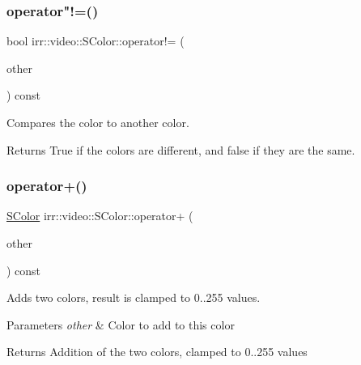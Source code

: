 \subsubsection{\texorpdfstring{operator"!=()}{operator!=()}}
{\footnotesize\ttfamily bool irr\+::video\+::\+S\+Color\+::operator!= (\begin{DoxyParamCaption}\item[{const \hyperlink{classirr_1_1video_1_1SColor}{S\+Color} \&}]{other }\end{DoxyParamCaption}) const\hspace{0.3cm}{\ttfamily [inline]}}



Compares the color to another color. 

\begin{DoxyReturn}{Returns}
True if the colors are different, and false if they are the same. 
\end{DoxyReturn}
\mbox{\label{classirr_1_1video_1_1SColor_a3de50f1cde7bf3f5b1af79c64cd0cdbd}} 
\subsubsection{\texorpdfstring{operator+()}{operator+()}}
{\footnotesize\ttfamily \hyperlink{classirr_1_1video_1_1SColor}{S\+Color} irr\+::video\+::\+S\+Color\+::operator+ (\begin{DoxyParamCaption}\item[{const \hyperlink{classirr_1_1video_1_1SColor}{S\+Color} \&}]{other }\end{DoxyParamCaption}) const\hspace{0.3cm}{\ttfamily [inline]}}



Adds two colors, result is clamped to 0..255 values. 


\begin{DoxyParams}{Parameters}
{\em other} & Color to add to this color \\
\hline
\end{DoxyParams}
\begin{DoxyReturn}{Returns}
Addition of the two colors, clamped to 0..255 values 
\end{DoxyReturn}
\mbox{\label{classirr_1_1video_1_1SColor_adf45f90ff13a1eb56b5784a3fba20247}} 
